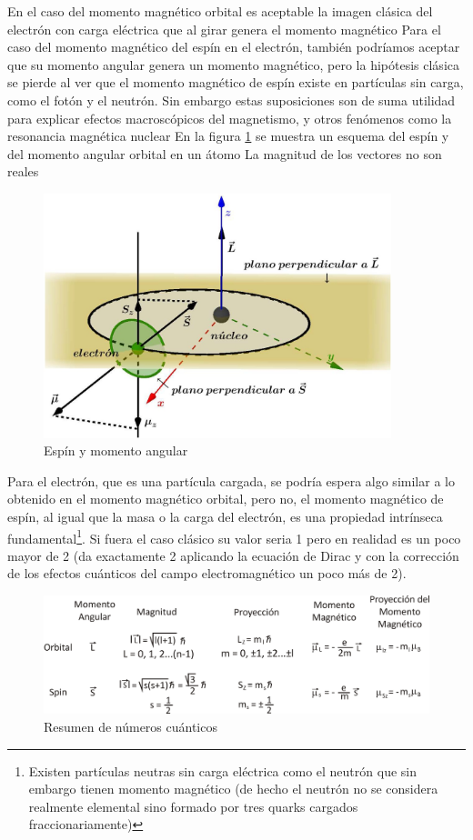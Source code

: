 En el caso del momento magnético orbital es aceptable la imagen clásica del electrón con carga eléctrica que al girar genera el momento magnético Para el caso del momento magnético del espín en el electrón, también podríamos aceptar que su momento angular genera un momento magnético, pero la hipótesis clásica se pierde al ver que el momento magnético de espín existe en partículas sin carga, como el fotón y el neutrón. Sin embargo estas suposiciones son de suma utilidad para explicar efectos macroscópicos del magnetismo, y otros fenómenos como la resonancia magnética nuclear En la figura \ref{fig:114} se muestra un esquema del espín y del momento angular orbital en un átomo La magnitud de los vectores no son reales

\begin{figure}[H]
    \centering
    \includegraphics[width=0.9\textwidth]{./Figures/fig114}
	\caption{Espín y momento angular}
	\label{fig:114}
 \end{figure}


Para el electrón, que es una partícula cargada, se podría espera algo similar a lo obtenido en el momento magnético orbital, pero no, el momento magnético de espín, al igual que la masa o la carga del electrón, es una propiedad intrínseca fundamental\footnote{Existen partículas neutras sin carga eléctrica como el neutrón que sin embargo tienen momento magnético (de hecho el neutrón no se considera realmente elemental sino formado por tres quarks cargados fraccionariamente)}. Si fuera el caso clásico su valor seria 1 pero en realidad es un poco mayor de 2 (da exactamente 2 aplicando la ecuación de Dirac y con la corrección de los efectos cuánticos del campo electromagnético un poco más de 2).


\begin{figure}[H]
    \centering
    \includegraphics[width=1.0\textwidth]{./Figures/LyS}
	\caption{Resumen de números cuánticos}
	\label{fig:GraficoLyS}
\end{figure}


